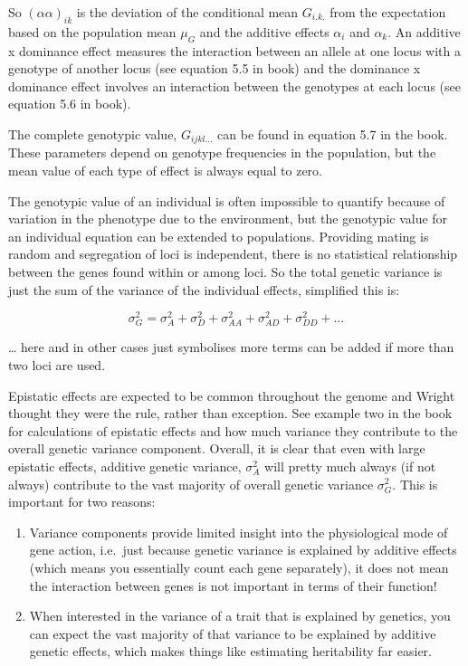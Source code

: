 \documentclass[
]{book}
\providecommand{\tightlist}{%
  \setlength{\itemsep}{0pt}\setlength{\parskip}{0pt}}
\begin{document}
So \(\left(\alpha\alpha\right)_{ik}\) is the deviation of the conditional mean \(G_{i.k.}\) from the expectation based on the population mean \(\mu_{G}\) and the additive effects \(\alpha_{i}\) and \(\alpha_{k}\). An additive x dominance effect measures the interaction between an allele at one locus with a genotype of another locus (see equation 5.5 in book) and the dominance x dominance effect involves an interaction between the genotypes at each locus (see equation 5.6 in book).

The complete genotypic value, \(G_{ijkl...}\) can be found in equation 5.7 in the book. These parameters depend on genotype frequencies in the population, but the mean value of each type of effect is always equal to zero.

The genotypic value of an individual is often impossible to quantify because of variation in the phenotype due to the environment, but the genotypic value for an individual equation can be extended to populations. Providing mating is random and segregation of loci is independent, there is no statistical relationship between the genes found within or among loci. So the total genetic variance is just the sum of the variance of the individual effects, simplified this is:

\begin{equation}
  \sigma^{2}_{G} = \sigma^{2}_{A} + \sigma^{2}_{D} + \sigma^{2}_{AA} + \sigma^{2}_{AD} + \sigma^{2}_{DD} + ...
  \label{eq:multilocus-genetic-variance}
\end{equation}

\ldots{} here and in other cases just symbolises more terms can be added if more than two loci are used.

Epistatic effects are expected to be common throughout the genome and Wright thought they were the rule, rather than exception. See example two in the book for calculations of epistatic effects and how much variance they contribute to the overall genetic variance component. Overall, it is clear that even with large epistatic effects, additive genetic variance, \(\sigma^{2}_{A}\) will pretty much always (if not always) contribute to the vast majority of overall genetic variance \(\sigma^{2}_{G}\). This is important for two reasons:

\begin{enumerate}
\def\labelenumi{\arabic{enumi}.}
\tightlist
\item
  Variance components provide limited insight into the physiological mode of gene action, i.e.~just because genetic variance is explained by additive effects (which means you essentially count each gene separately), it does not mean the interaction between genes is not important in terms of their function!
\item
  When interested in the variance of a trait that is explained by genetics, you can expect the vast majority of that variance to be explained by additive genetic effects, which makes things like estimating heritability far easier.
\end{enumerate}
\end{document}
